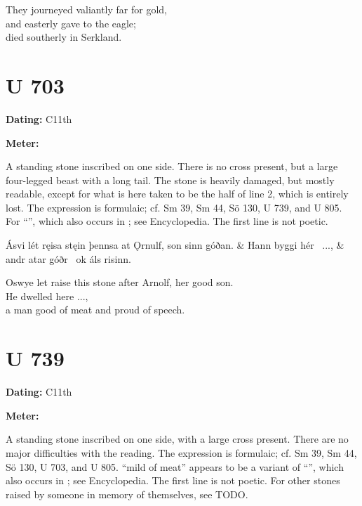 \bvb They journeyed valiantly far for gold, \\
and easterly gave to the eagle; \\
died southerly in Serkland.\evb\evg

\sectionline

\section{U 703}

\begin{flushright}%
\textbf{Dating:} C11th

\textbf{Meter:} \Fornyrdislag
\end{flushright}%

A standing stone inscribed on one side.  There is no cross present, but a large four-legged beast with a long tail.  The stone is heavily damaged, but mostly readable, except for what is here taken to be the half of line 2, which is entirely lost.  The expression is formulaic; cf. Sm 39, Sm 44, Sö 130, U 739, and U 805.  For “”, which also occurs in \Havamal; see Encyclopedia.  The first line is not poetic.

\sectionline

\bvg\bva[]%
Ásvi lét ręisa stęin þennsa at Ǫrnulf, son sinn góðan. &
Hann byggi hér \hld\ ..., &
andr atar góðr \hld\ ok áls risinn.\eva

\bvb Oswye let raise this stone after Arnolf, her good son. \\
He dwelled here ..., \\
a man good of meat and proud of speech.\evb\evg

\sectionline

\section{U 739}

\begin{flushright}%
\textbf{Dating:} C11th

\textbf{Meter:} \Fornyrdislag
\end{flushright}%

A standing stone inscribed on one side, with a large cross present.  There are no major difficulties with the reading.  The expression is formulaic; cf. Sm 39, Sm 44, Sö 130, U 703, and U 805.  “mild of meat” appears to be a variant of “”, which also occurs in \Havamal; see Encyclopedia.  The first line is not poetic.  For other stones raised by someone in memory of themselves, see TODO.


